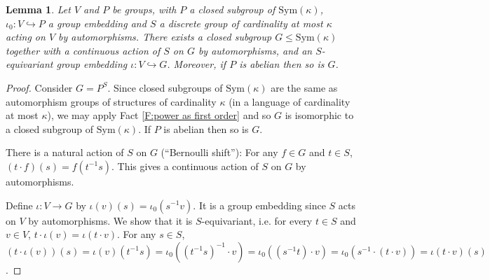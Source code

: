 \documentclass[11pt]{amsart}
\theoremstyle{plain}
\newtheorem{lemma}[theorem]{Lemma}
\theoremstyle{definition}
\begin{document}
\begin{lemma}\label{L:enlarge to polish}
    Let $V$ and $P$ be groups, with $P$ a closed subgroup of $\mathrm{Sym}(\kappa)$, $\iota_0:V\hookrightarrow P$ a group embedding and $S$ a discrete group of cardinality at most $\kappa$ acting on $V$ by automorphisms. There exists a closed subgroup $G\leq\mathrm{Sym}(\kappa)$ together with a \emph{continuous} action of $S$ on $G$ by automorphisms, and an $S$-equivariant group embedding $\iota: V\hookrightarrow G$. Moreover, if $P$ is abelian then so is $G$.
\end{lemma}
\begin{proof}
     Consider $G=P^S$. Since closed subgroups of $\mathrm{Sym}(\kappa)$ are the same as automorphism groups of structures of cardinality $\kappa$ (in a language of cardinality at most $\kappa$), we may apply Fact \ref{F:power as first order} and so $G$ is isomorphic to a closed subgroup of $\mathrm{Sym}(\kappa)$.  If $P$ is abelian then so is $G$. 
     
     There is a natural action of $S$ on $G$ (``Bernoulli shift''): For any $f\in G$ and $t\in S$, $(t\cdot f)(s)=f(t^{-1}s)$. This gives a continuous action of $S$ on $G$ by automorphisms. 
    
    Define $\iota: V\to G$ by $\iota(v)(s)=\iota_0(s^{-1}v)$. It is a group embedding since $S$ acts on $V$ by automorphisms. We show that it is $S$-equivariant, i.e. for every $t\in S$ and $v\in V$, $t\cdot\iota(v)=\iota(t\cdot v)$. For any $s\in S$, $(t\cdot \iota(v))(s)=\iota(v)(t^{-1}s)=\iota_0((t^{-1}s)^{-1}\cdot v)=\iota_0((s^{-1}t)\cdot v)=\iota_0(s^{-1}\cdot(t\cdot v))=\iota(t\cdot v)(s)$.
\end{proof}
\end{document}
